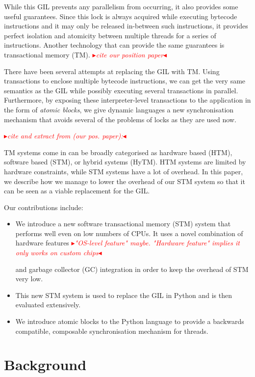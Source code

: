 \documentclass{sigplanconf}
\newcommand{\mynote}[2]{%
  \textcolor{red}{%
    \fbox{\bfseries\sffamily\scriptsize#1}%
    {\small$\blacktriangleright$\textsf{\emph{#2}}$\blacktriangleleft$}%
  }%
}
\newcommand\remi[1]{\mynote{Remi}{#1}}
\newcommand\arigo[1]{\mynote{arigo}{#1}}
\begin{document}
While this GIL prevents any parallelism from occurring, it also
provides some useful guarantees. Since this lock is always acquired
while executing bytecode instructions and it may only be released
in-between such instructions, it provides perfect isolation and
atomicity between multiple threads for a series of
instructions. Another technology that can provide the same guarantees
is transactional memory (TM). \remi{cite our position paper}

There have been several attempts at replacing the GIL with TM. Using
transactions to enclose multiple bytecode instructions, we can get the
very same semantics as the GIL while possibly executing several
transactions in parallel. Furthermore, by exposing these
interpreter-level transactions to the application in the form of
\emph{atomic blocks}, we give dynamic languages a new synchronisation
mechanism that avoids several of the problems of locks as they are
used now.

\remi{cite and extract from (our pos. paper):}
TM systems come in can be broadly categorised as hardware based (HTM),
software based (STM), or hybrid systems (HyTM). HTM systems are limited
by hardware constraints, while STM systems have a lot of overhead.
In this paper, we describe how we manage to lower the overhead of our
STM system so that it can be seen as a viable replacement for the GIL.

Our contributions include:
\begin{itemize}[noitemsep]
\item We introduce a new software transactional memory (STM) system
  that performs well even on low numbers of CPUs. It uses a novel
  combination of hardware features\arigo{"OS-level feature" maybe.
  "Hardware feature" implies it only works on custom chips}
  and garbage collector (GC)
  integration in order to keep the overhead of STM very low.
\item This new STM system is used to replace the GIL in Python and is
  then evaluated extensively.
\item We introduce atomic blocks to the Python language to provide a
  backwards compatible, composable synchronisation mechanism for
  threads.
\end{itemize}



\section{Background}
\end{document}
